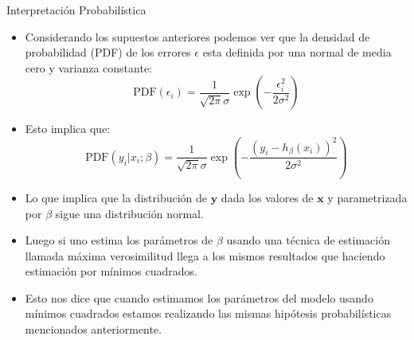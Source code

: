 \documentclass[handout]{beamer}
\begin{document}
\begin{frame}{Interpretación Probabilística}
\scriptsize{
\begin{itemize}
 \item Considerando los supuestos anteriores podemos ver que la densidad de probabilidad (PDF) de los errores $\epsilon$ esta definida por una normal de media cero y varianza constante:
 \begin{displaymath}
  \text{PDF}(\epsilon_{i})=\frac{1}{\sqrt{2\pi} \sigma} \exp \left(- \frac{\epsilon_{i}^{2}}{2\sigma^2}\right)
 \end{displaymath}
 \item Esto implica que:
  \begin{displaymath}
  \text{PDF}(y_i|x_{i};\beta)=\frac{1}{\sqrt{2\pi} \sigma} \exp \left(- \frac{(y_i - h_{\beta}(x_{i}) )^{2}}{2\sigma^2}\right)
 \end{displaymath}
 \item Lo que implica que la distribución de $\mathbf{y}$ dada los valores de $\mathbf{x}$ y parametrizada por $\beta$ sigue una distribución normal.
 \item Luego si uno estima los parámetros de $\beta$ usando una técnica de estimación llamada máxima verosimilitud llega a los mismos resultados que haciendo estimación por mínimos cuadrados.
 \item Esto nos dice que cuando estimamos los parámetros del modelo usando mínimos cuadrados estamos realizando las mismas hipótesis probabilísticas mencionados anteriormente.
 

\end{itemize}


}
 
\end{frame}
\end{document}
